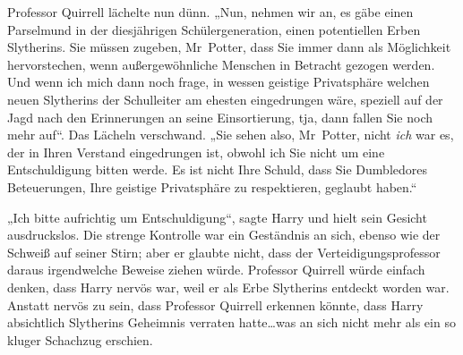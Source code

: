Professor Quirrell lächelte nun dünn. „Nun, nehmen wir an, es gäbe einen Parselmund in der diesjährigen Schülergeneration, einen potentiellen Erben Slytherins. Sie müssen zugeben, Mr~Potter, dass Sie immer dann als Möglichkeit hervorstechen, wenn außergewöhnliche Menschen in Betracht gezogen werden. Und wenn ich mich dann noch frage, in wessen geistige Privatsphäre welchen neuen Slytherins der Schulleiter am ehesten eingedrungen wäre, speziell auf der Jagd nach den Erinnerungen an seine Einsortierung, tja, dann fallen Sie noch mehr auf“. Das Lächeln verschwand. „Sie sehen also, Mr~Potter, nicht \emph{ich} war es, der in Ihren Verstand eingedrungen ist, obwohl ich Sie nicht um eine Entschuldigung bitten werde. Es ist nicht Ihre Schuld, dass Sie Dumbledores Beteuerungen, Ihre geistige Privatsphäre zu respektieren, geglaubt haben.“

„Ich bitte aufrichtig um Entschuldigung“, sagte Harry und hielt sein Gesicht ausdruckslos. Die strenge Kontrolle war ein Geständnis an sich, ebenso wie der Schweiß auf seiner Stirn; aber er glaubte nicht, dass der Verteidigungsprofessor daraus irgendwelche Beweise ziehen würde. Professor Quirrell würde einfach denken, dass Harry nervös war, weil er als Erbe Slytherins entdeckt worden war. Anstatt nervös zu sein, dass Professor Quirrell erkennen könnte, dass Harry absichtlich Slytherins Geheimnis verraten hatte…was an sich nicht mehr als ein so kluger Schachzug erschien.

